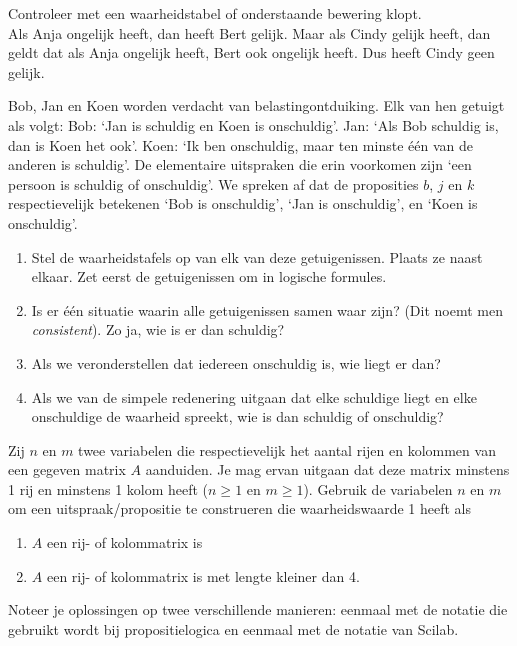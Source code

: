 \begin{oef}
Controleer met een waarheidstabel of onderstaande bewering klopt.\\
Als Anja ongelijk heeft, dan heeft Bert gelijk. Maar als Cindy gelijk
heeft, dan geldt dat als Anja ongelijk heeft, Bert ook ongelijk
heeft. Dus heeft Cindy geen gelijk.
\end{oef}

\begin{oef}
Bob, Jan en Koen worden verdacht van belastingontduiking. Elk van hen getuigt als volgt:
Bob: `Jan is schuldig en Koen is onschuldig'.
Jan: `Als Bob schuldig is, dan is Koen het ook'.
Koen: `Ik ben onschuldig, maar ten minste \'{e}\'{e}n van de anderen is schuldig'.
De elementaire uitspraken die erin voorkomen zijn `een persoon is schuldig of onschuldig'. We spreken af dat de proposities $b$, $j$ en $k$ respectievelijk betekenen `Bob is onschuldig', `Jan is onschuldig', en `Koen is onschuldig'.
\begin{enumerate}
\item Stel de waarheidstafels op van elk van deze getuigenissen. Plaats ze naast elkaar. Zet eerst de getuigenissen om in logische formules.
\item Is er \'{e}\'{e}n situatie waarin alle getuigenissen samen waar zijn? (Dit noemt men \emph{consistent}). Zo ja, wie is er dan schuldig?
\item Als we veronderstellen dat iedereen onschuldig is, wie liegt er dan?
\item Als we van de simpele redenering uitgaan dat elke schuldige liegt en elke onschuldige de waarheid spreekt, wie is dan schuldig of onschuldig?
\end{enumerate}

\end{oef}

\begin{oef}
 Zij $n$ en $m$ twee variabelen die respectievelijk het aantal rijen en kolommen van een gegeven matrix $A$ aanduiden. Je mag ervan uitgaan dat deze matrix minstens 1 rij en minstens 1 kolom heeft ($n \geqslant 1$ en $m\geqslant 1$). Gebruik de variabelen $n$ en $m$ om een uitspraak/propositie te construeren die waarheidswaarde 1 heeft als

\begin{enumerate}
\item $A$ een rij- of kolommatrix is
\item  $A$ een rij- of kolommatrix is met lengte kleiner dan 4.
\end{enumerate}
Noteer je oplossingen op twee verschillende manieren: eenmaal met de notatie die gebruikt wordt bij propositielogica en eenmaal met de notatie van Scilab.

\end{oef}

